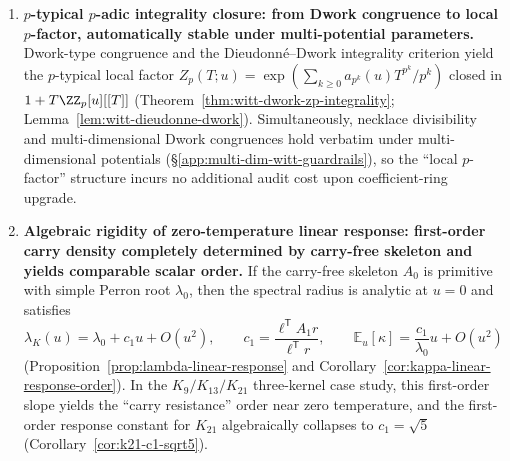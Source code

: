 \begin{enumerate}
  \item \textbf{\texorpdfstring{$p$}{p}-typical \texorpdfstring{$p$}{p}-adic integrality closure: from Dwork congruence to local \texorpdfstring{$p$}{p}-factor, automatically stable under multi-potential parameters.}
  Dwork-type congruence and the Dieudonn\'e--Dwork integrality criterion yield the \(p\)-typical local factor
  \(
  Z_p(T;u)=\exp(\sum_{k\ge 0}a_{p^k}(u)T^{p^k}/p^k)
  \)
  closed in \(1+T\ZZ_p[u][[T]]\) (Theorem~\ref{thm:witt-dwork-zp-integrality}; Lemma~\ref{lem:witt-dieudonne-dwork}).
  Simultaneously, necklace divisibility and multi-dimensional Dwork congruences hold verbatim under multi-dimensional potentials (\S\ref{app:multi-dim-witt-guardrails}), so the ``local \(p\)-factor'' structure incurs no additional audit cost upon coefficient-ring upgrade.

  \item \textbf{Algebraic rigidity of zero-temperature linear response: first-order carry density completely determined by carry-free skeleton and yields comparable scalar order.}
  If the carry-free skeleton \(A_0\) is primitive with simple Perron root \(\lambda_0\), then the spectral radius is analytic at \(u=0\) and satisfies
  \[
  \lambda_K(u)=\lambda_0+c_1u+O(u^2),
  \qquad
  c_1=\frac{\ell^{\mathsf T}A_1 r}{\ell^{\mathsf T}r},
  \qquad
  \mathbb{E}_u[\kappa]=\frac{c_1}{\lambda_0}u+O(u^2)
  \]
  (Proposition~\ref{prop:lambda-linear-response} and Corollary~\ref{cor:kappa-linear-response-order}).
  In the \(K_9/K_{13}/K_{21}\) three-kernel case study, this first-order slope yields the ``carry resistance'' order near zero temperature, and the first-order response constant for \(K_{21}\) algebraically collapses to \(c_1=\sqrt5\) (Corollary~\ref{cor:k21-c1-sqrt5}).
\end{enumerate}

